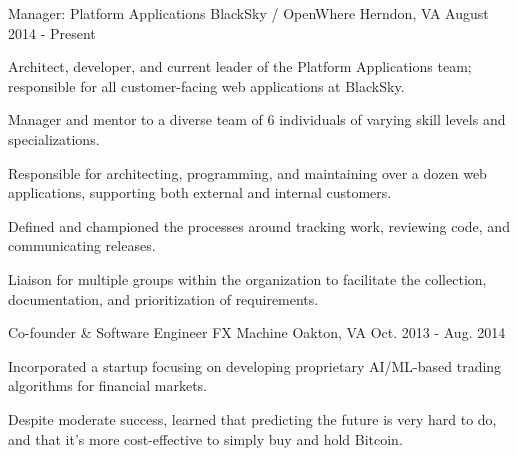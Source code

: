 

\begin{cventries}

  \cventry
    {Manager: Platform Applications} %
    {BlackSky / OpenWhere} %
    {Herndon, VA} %
    {August 2014 - Present} %
    {
      \begin{cvitems} %
        \item {Architect, developer, and current leader of the Platform Applications team; responsible for all customer-facing web applications at BlackSky.}
        \item {Manager and mentor to a diverse team of 6 individuals of varying skill levels and specializations.}
        \item {Responsible for architecting, programming, and maintaining over a dozen web applications, supporting both external and internal customers.}
        \item {Defined and championed the processes around tracking work, reviewing code, and communicating releases.}
        \item {Liaison for multiple groups within the organization to facilitate the collection, documentation, and prioritization of requirements.}
      \end{cvitems}
    }

  \cventry
    {Co-founder \& Software Engineer} %
    {FX Machine} %
    {Oakton, VA} %
    {Oct. 2013 - Aug. 2014} %
    {
      \begin{cvitems} %
        \item {Incorporated a startup focusing on developing proprietary AI/ML-based trading algorithms for financial markets.}
        \item {Despite moderate success, learned that predicting the future is very hard to do, and that it's more cost-effective to simply buy and hold Bitcoin.}
      \end{cvitems}
    }


\end{cventries}
